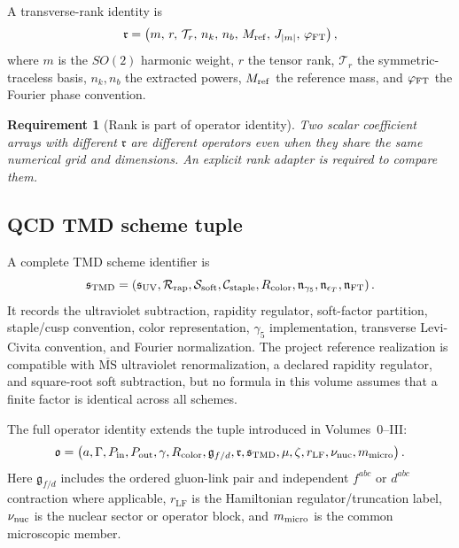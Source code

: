\documentclass[11pt]{article}
\newtheorem{requirement}[definition]{Requirement}
\newcommand{\LF}{\mathrm{LF}}
\newcommand{\TMD}{\mathrm{TMD}}
\newcommand{\MSbar}{\overline{\mathrm{MS}}}
\newcommand{\soft}{\mathrm{soft}}
\newcommand{\rap}{\mathrm{rap}}
\newcommand{\UV}{\mathrm{UV}}
\begin{document}
A transverse-rank identity is
\begin{equation}
 \mathfrak r=
 \left(
 m,\,r,\,\mathcal T_r,\,n_k,\,n_b,\,M_{\rm ref},\,
 J_{|m|},\,\varphi_{\rm FT}
 \right),
 \label{eq:rank-identity}
\end{equation}
where \(m\) is the \(SO(2)\) harmonic weight, \(r\) the tensor rank,
\(\mathcal T_r\) the symmetric-traceless basis, \(n_k,n_b\) the extracted
powers, \(M_{\rm ref}\) the reference mass, and \(\varphi_{\rm FT}\) the
Fourier phase convention.

\begin{requirement}[Rank is part of operator identity]
Two scalar coefficient arrays with different \(\mathfrak r\) are different
operators even when they share the same numerical grid and dimensions.  An
explicit rank adapter is required to compare them.
\end{requirement}

\subsection{QCD TMD scheme tuple}

A complete TMD scheme identifier is
\begin{equation}
 \mathfrak s_{\TMD}=
 \left(
 \mathfrak s_{\UV},
 \mathcal R_{\rap},
 \mathcal S_{\soft},
 \mathcal C_{\rm staple},
 R_{\rm color},
 \mathfrak n_{\gamma_5},
 \mathfrak n_{\epsilon_T},
 \mathfrak n_{\rm FT}
 \right).
 \label{eq:tmd-scheme-tuple}
\end{equation}
It records the ultraviolet subtraction, rapidity regulator, soft-factor
partition, staple/cusp convention, color representation, \(\gamma_5\)
implementation, transverse Levi-Civita convention, and Fourier normalization.
The project reference realization is compatible with \(\MSbar\) ultraviolet
renormalization, a declared rapidity regulator, and square-root soft
subtraction, but no formula in this volume assumes that a finite factor is
identical across all schemes.

The full operator identity extends the tuple introduced in Volumes~0--III:
\begin{equation}
 \mathfrak o=
 \left(
 a,\Gamma,P_{\rm in},P_{\rm out},\gamma,R_{\rm color},
 \mathfrak g_{f/d},\mathfrak r,
 \mathfrak s_{\TMD},\mu,\zeta,
 r_{\LF},\nu_{\rm nuc},m_{\rm micro}
 \right).
 \label{eq:full-operator-identity}
\end{equation}
Here \(\mathfrak g_{f/d}\) includes the ordered gluon-link pair and independent
\(f^{abc}\) or \(d^{abc}\) contraction where applicable, \(r_{\LF}\) is the
Hamiltonian regulator/truncation label, \(\nu_{\rm nuc}\) is the nuclear
sector or operator block, and \(m_{\rm micro}\) is the common microscopic
member.
\end{document}
